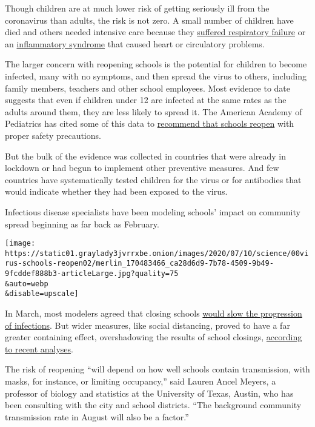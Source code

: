 Though children are at much lower risk of getting seriously ill from the
coronavirus than adults, the risk is not zero. A small number of
children have died and others needed intensive care because they
\href{https://www.nytimes3xbfgragh.onion/2020/04/06/health/coronavirus-children-us.html}{suffered
respiratory failure} or an
\href{https://www.nytimes3xbfgragh.onion/2020/05/17/health/coronavirus-multisystem-fnflammatory-syndrome-children-teenagers.html}{inflammatory
syndrome} that caused heart or circulatory problems.

The larger concern with reopening schools is the potential for children
to become infected, many with no symptoms, and then spread the virus to
others, including family members, teachers and other school employees.
Most evidence to date suggests that even if children under 12 are
infected at the same rates as the adults around them, they are less
likely to spread it. The American Academy of Pediatrics has cited some
of this data to
\href{https://services.aap.org/en/pages/2019-novel-coronavirus-covid-19-infections/clinical-guidance/covid-19-planning-considerations-return-to-in-person-education-in-schools/}{recommend
that schools reopen} with proper safety precautions.

But the bulk of the evidence was collected in countries that were
already in lockdown or had begun to implement other preventive measures.
And few countries have systematically tested children for the virus or
for antibodies that would indicate whether they had been exposed to the
virus.

Infectious disease specialists have been modeling schools' impact on
community spread beginning as far back as February.

\texttt{[image: https://static01.graylady3jvrrxbe.onion/images/2020/07/10/science/00virus-schools-reopen02/merlin\_170483466\_ca28d6d9-7b78-4509-9b49-9fcddef888b3-articleLarge.jpg?quality=75\\\&auto=webp\\\&disable=upscale]}

In March, most modelers agreed that closing schools
\href{https://www.nytimes3xbfgragh.onion/2020/05/05/health/coronavirus-children-transmission-school.html}{would
slow the progression of infections}. But wider measures, like social
distancing, proved to have a far greater containing effect,
overshadowing the results of school closings,
\href{https://www.medrxiv.org/content/10.1101/2020.04.16.20068403v1}{according
to recent analyses}.

The risk of reopening ``will depend on how well schools contain
transmission, with masks, for instance, or limiting occupancy,'' said
Lauren Ancel Meyers, a professor of biology and statistics at the
University of Texas, Austin, who has been consulting with the city and
school districts. ``The background community transmission rate in August
will also be a factor.''

